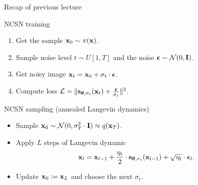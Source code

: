 \begin{frame}{Recap of previous lecture}
	\begin{block}{NCSN training}
		\begin{enumerate}
			\item Get the sample $\mathbf{x}_0 \sim \pi(\mathbf{x})$.
			\item Sample noise level $t \sim U[1, T]$ and the noise $\boldsymbol{\epsilon} \sim \mathcal{N}(0, \mathbf{I})$.
			\item Get noisy image $\mathbf{x}_t = \mathbf{x}_0 + \sigma_t \cdot \boldsymbol{\epsilon}$.
			\item Compute loss $ \mathcal{L} = \| \mathbf{s}_{\boldsymbol{\theta}, \sigma_t}(\mathbf{x}_t) + \frac{\boldsymbol{\epsilon}}{\sigma_t} \|^2 $.
		\end{enumerate}
	\end{block}
	\begin{block}{NCSN sampling (annealed Langevin dynamics)}
		\begin{itemize}
			\item Sample $\mathbf{x}_0 \sim \mathcal{N}(0, \sigma_T^2 \cdot \mathbf{I}) \approx q(\mathbf{x}_T)$.
			\item Apply $L$ steps of Langevin dynamic
			\vspace{-0.2cm}
			\[
				\mathbf{x}_l = \mathbf{x}_{l-1} + \frac{\eta_t}{2} \cdot \mathbf{s}_{\boldsymbol{\theta}, \sigma_t}(\mathbf{x}_{l - 1}) + \sqrt{\eta_t} \cdot \boldsymbol{\epsilon}_l.
			\] 
			\vspace{-0.5cm}
			\item Update $\mathbf{x}_0 := \mathbf{x}_L$ and choose the next $\sigma_t$.
		\end{itemize}
	\end{block}
\end{frame}
